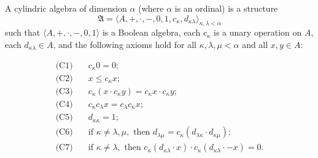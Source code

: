 A cylindric algebra of dimension $\alpha$ (where $\alpha$ is an ordinal) is a structure
$$\mathfrak{A} = \langle A, +, \cdot, -, 0, 1, c_\kappa, d_{\kappa \lambda} \rangle_{\kappa,\lambda < \alpha}$$
such that $\langle A, +, \cdot, -, 0, 1 \rangle$ is a Boolean algebra, each $c_\kappa$ is a unary operation on $A$, each $d_{\kappa \lambda} \in A$, and the following axioms hold for all $\kappa, \lambda, \mu < \alpha$ and all $x, y \in A$:

\begin{align}
\text{(C1)} &\quad c_\kappa 0 = 0; \\
\text{(C2)} &\quad x \leq c_\kappa x; \\
\text{(C3)} &\quad c_\kappa(x \cdot c_\kappa y) = c_\kappa x \cdot c_\kappa y; \\
\text{(C4)} &\quad c_\kappa c_\lambda x = c_\lambda c_\kappa x; \\
\text{(C5)} &\quad d_{\kappa \kappa} = 1; \\
\text{(C6)} &\quad \text{if } \kappa \neq \lambda, \mu,\text{ then } d_{\lambda \mu} = c_\kappa(d_{\lambda \kappa} \cdot d_{\kappa \mu}); \\
\text{(C7)} &\quad \text{if } \kappa \neq \lambda,\text{ then } c_\kappa(d_{\kappa \lambda} \cdot x) \cdot c_\kappa(d_{\kappa \lambda} \cdot -x) = 0.
\end{align}

